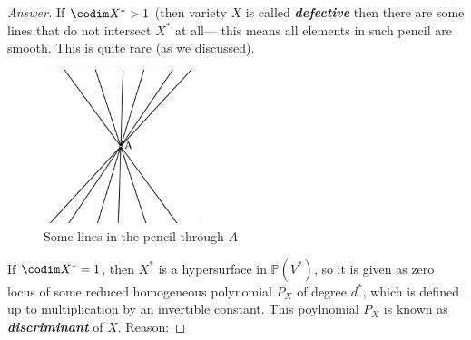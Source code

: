 \documentclass{article}
\renewcommand{\P}{\mathbb{P}}
\begin{document}
\begin{proof}[Answer]
	If $\codim X^*>1$ (then variety $X$ is called \textit{\textbf{defective}} then there are some lines that do not intersect $X^*$ at all--- this means all elements in such pencil are smooth. This is quite rare (as we discussed).
	\begin{figure}[H]
		\centering
		\includegraphics[width=0.4\textwidth]{pencil.png}
		\caption*{Some lines in the pencil through $A$}
	\end{figure}
	If $\codim X^*=1$, then $X^*$ is a hypersurface in $\P(V^*)$, so it is given as zero locus of some reduced homogeneous polynomial $P_X$ of degree $d^*$, which is defined up to multiplication by an invertible constant. This poylnomial $P_X$ is known as \textit{\textbf{discriminant}} of $X$. Reason:

\end{proof}

\end{document}
